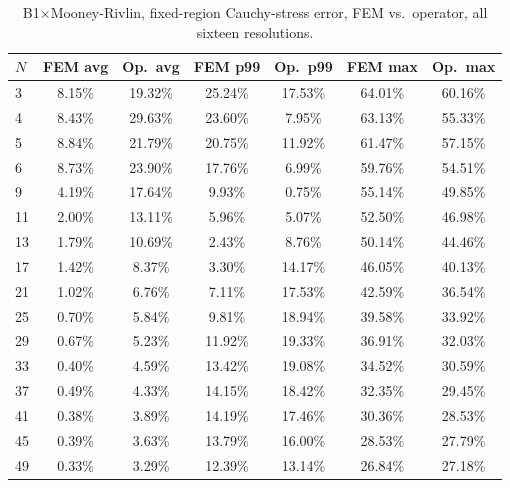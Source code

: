 \documentclass[11pt]{article}
\begin{document}
\begin{table}[h]
\centering
\caption{B1$\times$Mooney-Rivlin, fixed-region Cauchy-stress error, FEM
  vs.\ operator, all sixteen resolutions.}
\label{tab:s2-b1mr-b}
\scriptsize
\begin{tabular}{lcccccc}
\toprule
$N$ & FEM avg & Op.\ avg & FEM p99 & Op.\ p99 & FEM max & Op.\ max \\
\midrule
3  & 8.15\% & 19.32\% & 25.24\% & 17.53\% & 64.01\% & 60.16\% \\
4  & 8.43\% & 29.63\% & 23.60\% & 7.95\%  & 63.13\% & 55.33\% \\
5  & 8.84\% & 21.79\% & 20.75\% & 11.92\% & 61.47\% & 57.15\% \\
6  & 8.73\% & 23.90\% & 17.76\% & 6.99\%  & 59.76\% & 54.51\% \\
9  & 4.19\% & 17.64\% & 9.93\%  & 0.75\%  & 55.14\% & 49.85\% \\
11 & 2.00\% & 13.11\% & 5.96\%  & 5.07\%  & 52.50\% & 46.98\% \\
13 & 1.79\% & 10.69\% & 2.43\%  & 8.76\%  & 50.14\% & 44.46\% \\
17 & 1.42\% & 8.37\%  & 3.30\%  & 14.17\% & 46.05\% & 40.13\% \\
21 & 1.02\% & 6.76\%  & 7.11\%  & 17.53\% & 42.59\% & 36.54\% \\
25 & 0.70\% & 5.84\%  & 9.81\%  & 18.94\% & 39.58\% & 33.92\% \\
29 & 0.67\% & 5.23\%  & 11.92\% & 19.33\% & 36.91\% & 32.03\% \\
33 & 0.40\% & 4.59\%  & 13.42\% & 19.08\% & 34.52\% & 30.59\% \\
37 & 0.49\% & 4.33\%  & 14.15\% & 18.42\% & 32.35\% & 29.45\% \\
41 & 0.38\% & 3.89\%  & 14.19\% & 17.46\% & 30.36\% & 28.53\% \\
45 & 0.39\% & 3.63\%  & 13.79\% & 16.00\% & 28.53\% & 27.79\% \\
49 & 0.33\% & 3.29\%  & 12.39\% & 13.14\% & 26.84\% & 27.18\% \\
\bottomrule
\end{tabular}
\end{table}
\end{document}
